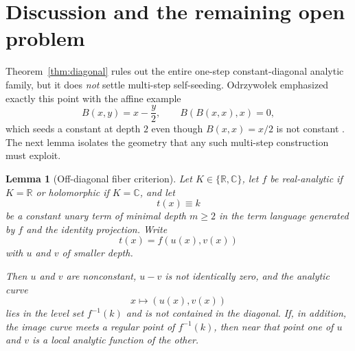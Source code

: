 \documentclass[12pt]{amsart}
\newtheorem{lemma}[theorem]{Lemma}
\theoremstyle{remark}
\newcommand{\C}{\mathbb{C}}
\newcommand{\R}{\mathbb{R}}
\begin{document}
\section{Discussion and the remaining open problem}\label{sec:discussion}

Theorem~\ref{thm:diagonal} rules out the entire one-step constant-diagonal analytic family, but it does \emph{not} settle multi-step self-seeding.  Odrzywo\l{}ek emphasized exactly this point with the affine example
\[
B(x,y)=x-\frac y2,
\qquad B(B(x,x),x)=0,
\]
which seeds a constant at depth $2$ even though $B(x,x)=x/2$ is not constant \cite{Odrzywolek2026}.  The next lemma isolates the geometry that any such multi-step construction must exploit.

\begin{lemma}[Off-diagonal fiber criterion]\label{lem:fibers}
Let $K\in\{\R,\C\}$, let $f$ be real-analytic if $K=\R$ or holomorphic if $K=\C$, and let
\[
t(x)\equiv k
\]
be a constant unary term of minimal depth $m\geq 2$ in the term language generated by $f$ and the identity projection.  Write
\[
t(x)=f(u(x),v(x))
\]
with $u$ and $v$ of smaller depth.

Then $u$ and $v$ are nonconstant, $u-v$ is not identically zero, and the analytic curve
\[
x\longmapsto (u(x),v(x))
\]
lies in the level set $f^{-1}(k)$ and is not contained in the diagonal.  If, in addition, the image curve meets a regular point of $f^{-1}(k)$, then near that point one of $u$ and $v$ is a local analytic function of the other.
\end{lemma}
\end{document}
